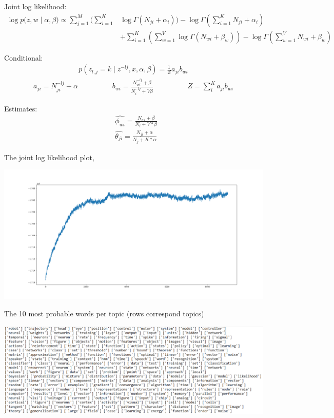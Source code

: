 \documentclass[10pt]{homeworg}
\begin{document}
 
Joint log likelihood:
\begin{align*}
\log{p(z,w \mid \alpha, \beta}) \propto \sum_{j=1}^M (\sum_{i=1}^K &\log{\Gamma(N_{ji} + \alpha_i)}) - \log{\Gamma(\sum_{i=1}^K N_{ji} + \alpha_i)}\\
& + \sum_{i=1}^K (\sum_{w=1}^V \log{\Gamma(N_{wi} + \beta_w)}) - \log{\Gamma(\sum_{w=1}^V N_{wi} + \beta_w)}
\end{align*}

Conditional:
\begin{align*}
p(z_{l,j} = k \mid z^{-lj}, x, \alpha, \beta) = \frac{1}{Z} a_{ji} b_{wi}
\end{align*}
\vspace{-0.5cm}
\begin{align*}
a_{ji} = N_{ji}^{-lj} + \alpha   \hspace{2cm}  b_{wi} = \frac{N_{wi}^{-lj} + \beta}{N_i^{-lj} + V\beta}  \hspace{2cm} Z = \sum_i^K a_{ji}b_{wi}
\end{align*}

Estimates:
\begin{align*}
&\hat{\phi_{wi}} = \frac{N_{wi} + \beta}{N_i + V*\beta}\\
&\hat{\theta_{ji}} = \frac{N_{ji}+\alpha}{N_j+K*\alpha}
\end{align*}


\newpage

The joint log likelihood plot,

\begin{center}
\includegraphics[scale=0.3]{figures/jll_remove_burnin.png}
\end{center}


The 10 most probable words per topic (rows correspond topics)

\begin{flushleft}
\includegraphics[scale=0.6]{figures/most_probable_words_per_topic.png}
\end{flushleft}
\end{document}
